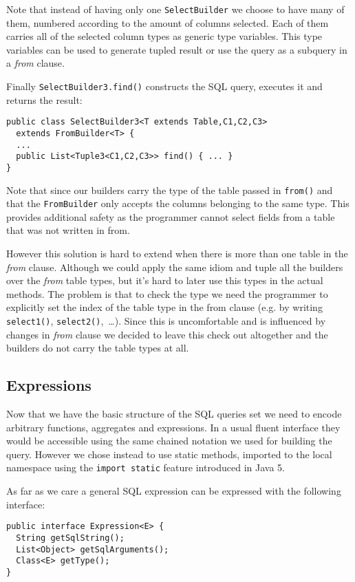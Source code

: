 \documentclass{sig-alternate}
\begin{document}
Note that instead of having only one \verb!SelectBuilder! we choose to have many of them, numbered according to the amount of columns selected. Each of them carries all of the selected column types as generic type variables. This type variables can be used to generate tupled result or use the query as a subquery in a \emph{from} clause.

Finally \verb!SelectBuilder3.find()! constructs the SQL query, executes it and returns the result:

\begin{verbatim}
public class SelectBuilder3<T extends Table,C1,C2,C3> 
  extends FromBuilder<T> {
  ...
  public List<Tuple3<C1,C2,C3>> find() { ... }
} 
\end{verbatim}

Note that since our builders carry the type of the table passed in \verb!from()! and that the \verb!FromBuilder! only accepts the columns belonging to the same type. This provides additional safety as the programmer cannot select fields from a table that was not written in from.

However this solution is hard to extend when there is more than one table in the \emph{from} clause. Although we could apply the same idiom and tuple all the builders over the \emph{from} table types, but it's hard to later use this types in the actual methods. The problem is that to check the type we need the programmer to explicitly set the index of the table type in the from clause (e.g. by writing \verb!select1()!, \verb!select2()!,~\ldots). Since this is uncomfortable and is influenced by changes in \emph{from} clause we decided to leave this check out altogether and the builders do not carry the table types at all.

\subsection{Expressions}

Now that we have the basic structure of the SQL queries set we need to encode arbitrary functions, aggregates and expressions. In a usual fluent interface they would be accessible using the same chained notation we used for building the query. However we chose instead to use static methods, imported to the local namespace using the \verb!import static! feature introduced in Java 5.

As far as we care a general SQL expression can be expressed with the following interface:

\begin{verbatim}
public interface Expression<E> {
  String getSqlString();
  List<Object> getSqlArguments();
  Class<E> getType();		
}
\end{verbatim}
\end{document}
